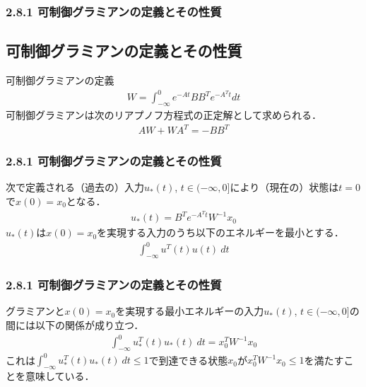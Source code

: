 \begin{frame}[t]
\frametitle{2.8.1 可制御グラミアンの定義とその性質}

\subsection{可制御グラミアンの定義とその性質}

\noindent
可制御グラミアンの定義
\begin{align}
	W=\int_{-\infty}^{0} e^{-At} B B^T e^{-A^T t} dt 
\end{align}
可制御グラミアンは次のリアプノフ方程式の正定解として求められる．
\begin{align}
	AW + WA^T = - BB^T
\end{align}

\end{frame}

\begin{frame}[t]
\frametitle{2.8.1 可制御グラミアンの定義とその性質}
次で定義される（過去の）入力$u_*(t)$, $t\in (-\infty, 0]$により（現在の）状態は$t=0$で$x(0)=x_0$となる．
\begin{align}
	u_{*}(t)= B^T e^{-A^T t} W^{-1} x_0
\end{align}
$u_{*}(t)$は$x(0)=x_0$を実現する入力のうち以下のエネルギーを最小とする．
\begin{align}
	\int_{-\infty}^{0} u^T(t) u(t) \ dt
\end{align}
\end{frame}

\begin{frame}[t]
\frametitle{2.8.1 可制御グラミアンの定義とその性質}
グラミアンと$x(0)=x_0$を実現する最小エネルギーの入力$u_*(t)$, $t \in (-\infty,0]$の間には以下の関係が成り立つ．
\begin{align}
	\int_{-\infty}^{0} u_*^T(t) u_*(t) \ dt = x_0^{T} W^{-1} x_0
\end{align}
これは$\int_{-\infty}^{0} u_*^T(t) u_*(t) \ dt \leq 1$で到達できる状態$x_0$が$x_0^{T} W^{-1} x_0 \leq 1$を満たすことを意味している．

\end{frame}

